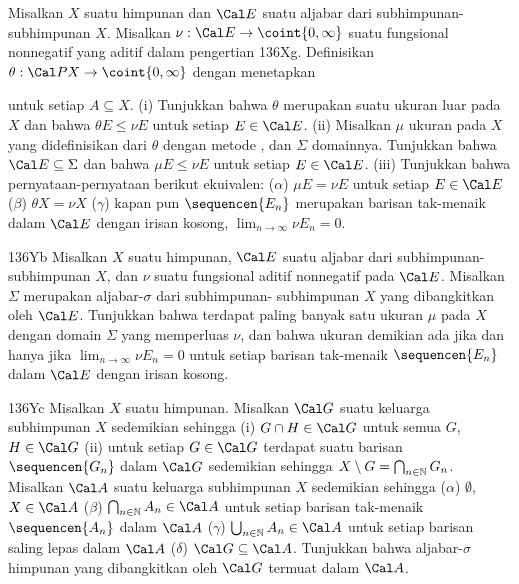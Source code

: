 { Misalkan $X$ suatu himpunan dan
$\Cal E$ suatu aljabar dari subhimpunan-subhimpunan $X$. Misalkan
$\nu:\Cal E\to\coint{0,\infty}$ suatu fungsional nonnegatif yang aditif dalam
pengertian 136Xg. Definisikan $\theta:\Cal PX\to\coint{0,\infty}$ dengan
menetapkan


\noindent untuk setiap $A\subseteq X$. (i) Tunjukkan bahwa $\theta$ merupakan
suatu ukuran luar pada $X$ dan bahwa $\theta E\le\nu E$ untuk setiap
$E\in\Cal E$. (ii) Misalkan $\mu$ ukuran pada $X$ yang didefinisikan dari
$\theta$ dengan metode \Caratheodory, dan $\Sigma$ domainnya. Tunjukkan bahwa
$\Cal E\subseteq\Sigma$ dan bahwa $\mu E\le\nu E$ untuk setiap
$E\in\Cal E$. (iii) Tunjukkan bahwa pernyataan-pernyataan berikut ekuivalen:
($\alpha$) $\mu E=\nu E$
untuk setiap $E\in\Cal E$ ($\beta$) $\theta X=\nu X$ ($\gamma$) kapan pun
$\sequencen{E_n}$ merupakan barisan tak-menaik dalam $\Cal E$ dengan irisan
kosong, $\lim_{n\to\infty}\nu E_n=0$.

\spheader 136Yb Misalkan $X$ suatu himpunan, $\Cal E$ suatu aljabar dari
subhimpunan-subhimpunan $X$, dan $\nu$ suatu fungsional aditif nonnegatif pada
$\Cal E$. Misalkan $\Sigma$ merupakan aljabar-$\sigma$ dari subhimpunan-
subhimpunan $X$ yang dibangkitkan oleh $\Cal E$. Tunjukkan bahwa terdapat
paling banyak satu ukuran $\mu$ pada $X$ dengan domain $\Sigma$ yang
memperluas $\nu$, dan bahwa ukuran demikian ada jika dan hanya jika
$\lim_{n\to\infty}\nu E_n=0$ untuk setiap barisan tak-menaik
$\sequencen{E_n}$ dalam $\Cal E$ dengan irisan kosong.

\spheader 136Yc Misalkan $X$ suatu himpunan. Misalkan $\Cal G$ suatu keluarga
subhimpunan $X$ sedemikian sehingga (i) $G\cap H\in\Cal G$ untuk semua $G$,
$H\in\Cal G$ (ii) untuk setiap $G\in\Cal G$ terdapat suatu barisan
$\sequencen{G_n}$ dalam $\Cal G$ sedemikian sehingga
$X\setminus G=\bigcap_{n\in\Bbb N}G_n$. Misalkan $\Cal A$ suatu keluarga
subhimpunan $X$ sedemikian sehingga ($\alpha$) $\emptyset$, $X\in\Cal A$
($\beta$) $\bigcap_{n\in\Bbb N}A_n\in\Cal A$
untuk setiap barisan tak-menaik $\sequencen{A_n}$ dalam
$\Cal A$ ($\gamma$) $\bigcup_{n\in\Bbb N}A_n\in\Cal A$ untuk setiap
barisan saling lepas dalam $\Cal A$ ($\delta$) $\Cal G\subseteq\Cal A$.
Tunjukkan bahwa aljabar-$\sigma$ himpunan yang dibangkitkan oleh $\Cal G$
termuat dalam $\Cal A$.
}%

